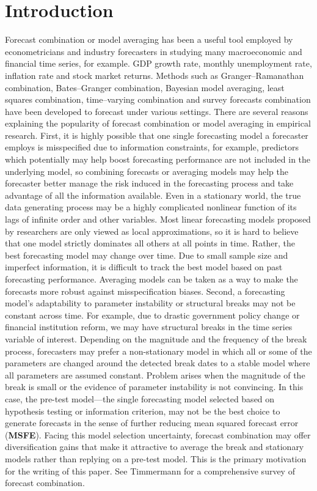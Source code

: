 \documentclass[a4paper,12pt]{article}
\begin{document}
\section{Introduction}
Forecast combination or model averaging has been a useful tool employed by econometricians and industry forecasters in studying many macroeconomic and financial time series, for example. GDP growth rate, monthly unemployment rate, inflation rate and stock market returns. Methods such as Granger--Ramanathan combination, Bates--Granger combination, Bayesian model averaging, least squares combination, time--varying combination and survey forecasts combination have been developed to forecast under various settings. There are several reasons explaining the popularity of forecast combination or model averaging in empirical research. First, it is highly possible that one single forecasting model a forecaster employs is misspecified due to information constraints, for example, predictors which potentially may help boost forecasting performance are not included in the underlying model, so combining forecasts or averaging models may help the forecaster better manage the risk induced in the forecasting process and take advantage of all the information available. Even in a stationary world, the true data generating process may be a highly complicated nonlinear function of its lags of infinite order and other variables. Most linear forecasting models proposed by researchers are only viewed as local approximations, so it is hard to believe that one model strictly dominates all others at all points in time. Rather, the best forecasting model may change over time. Due to small sample size and imperfect information, it is difficult to track the best model based on past forecasting performance. Averaging models can be taken as a way to make the forecasts more robust against misspecification biases. Second, a forecasting model's adaptability to parameter instability or structural breaks may not be constant across time. For example, due to drastic government policy change or financial institution reform, we may have structural breaks in the time series variable of interest. Depending on the magnitude and the frequency of the break process, forecasters may prefer a non-stationary model in which all or some of the parameters are changed around the detected break dates to a stable model where all parameters are assumed constant. Problem arises when the magnitude of the break is small or the evidence of parameter instability is not convincing. In this case, the pre-test model---the single forecasting model selected based on hypothesis testing or information criterion, may not be the best choice to generate forecasts in the sense of further reducing mean squared forecast error (\textbf{MSFE}). Facing this model selection uncertainty, forecast combination may offer diversification gains that make it attractive to average the break and stationary models rather than replying on a pre-test model. This is the primary motivation for the writing of this paper. See Timmermann \cite{timmermann2006forecast} for a comprehensive survey of forecast combination.
\end{document}
